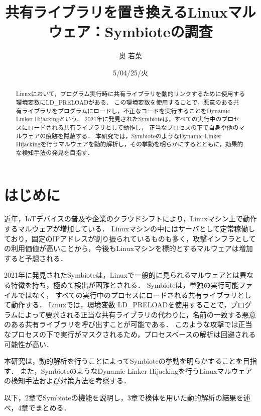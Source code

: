 \documentclass[submit,techreq,noauthor]{eco}	%
\begin{document}
\date   {5/04/25/火}				%
\title  {共有ライブラリを置き換えるLinuxマルウェア：Symbioteの調査}	%
\author {奥 若菜}				%


\begin{abstract}
	Linuxにおいて，プログラム実行時に共有ライブラリを動的リンクするために使用する環境変数にLD\_PRELOADがある．
  この環境変数を使用することで，悪意のある共有ライブラリをプログラムにロードし，不正なコードを実行することをDynamic Linker Hijackingという．\cite{MITRE-ATT&CK}
  2021年に発見されたSymbioteは，すべての実行中のプロセスにロードされる共有ライブラリとして動作し，
  正当なプロセスの下で自身や他のマルウェアの痕跡を隠蔽する．
  本研究では，SymbioteのようなDynamic Linker Hijackingを行うマルウェアを動的解析し，その挙動を明らかにするとともに，効果的な検知手法の発見を目指す．
\end{abstract}
\maketitle


\section{はじめに}
近年，IoTデバイスの普及や企業のクラウドシフトにより，Linuxマシン上で動作するマルウェアが増加している．\cite{TREND-MICRO}
Linuxマシンの中にはサーバとして定常稼働しており，固定のIPアドレスが割り振られているものも多く，攻撃インフラとしての利用価値が高いことから，今後もLinuxマシンを標的とするマルウェアは増加すると予想される．

2021年に発見されたSymbioteは，Linuxで一般的に見られるマルウェアとは異なる特徴を持ち，極めて検出が困難とされる．\cite{Symbiote}
Symbioteは，単独の実行可能ファイルではなく，
すべての実行中のプロセスにロードされる共有ライブラリとして動作する．
Linuxでは，環境変数 LD\_PRELOADを使用することで，プログラムによって要求される正当な共有ライブラリの代わりに，名前の一致する悪意のある共有ライブラリを呼び出すことが可能である．
このような攻撃では正当なプロセスの下で実行がマスクされるため，プロセスベースの解析は回避される可能性が高い．

本研究は，動的解析を行うことによってSymbioteの挙動を明らかすることを目指す．
また，SymbioteのようなDynamic Linker Hijackingを行うLinuxマルウェアの検知手法および対策方法を考察する．


以下，2章でSymbioteの機能を説明し，3章で検体を用いた動的解析の結果を述べ，4章でまとめる．\\
\end{document}
